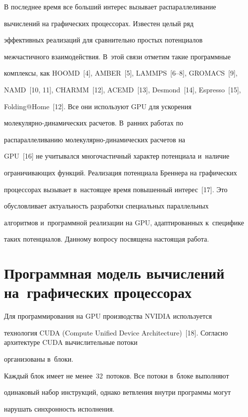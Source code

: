   В последнее время все больший интерес вызывает распараллеливание 

вы\-чис\-ле\-ний на графических процессорах. Известен целый ряд 

эффективных реализаций для сравнительно простых потенциалов 

межчастичного взаимодействия. В~этой связи отметим такие программные 

комплексы, как HOOMD~[4], AMBER~[5], LAMMPS~[6--8], GROMACS~[9], 

NAMD~[10, 11], CHARMM~[12], ACEMD~[13], Desmond~[14], Espresso~[15], 

Folding@Home~[12]. Все они используют GPU для ускорения  

мо\-ле\-ку\-ляр\-но-ди\-на\-ми\-че\-ских расчетов. В~ранних работах по 

распараллеливанию мо\-ле\-ку\-ляр\-но-ди\-на\-ми\-че\-ских расчетов на 

GPU~[16] не учитывался многочастичный характер потенциала и~наличие 

огра\-ни\-чи\-ва\-ющих функций. Реализация потенциала Бреннера на графических 

процессорах вызывает в~настоящее время повышенный интерес~[17]. Это 

обуслов\-ли\-ва\-ет актуальность разработки специальных параллельных 

алгоритмов и~программной реализации на GPU, адаптированных к~специфике 

таких потенциалов. Данному вопросу посвящена настоящая работа. 

  

  \section{Программная модель вычислений на~графических процессорах}

  

  Для программирования на GPU производства NVIDIA используется 

технология CUDA (Compute Unified Device Architecture)~[18]. Согласно архитектуре CUDA вычислительные потоки 

организованы в~блоки. 

  

  Каждый блок имеет не менее~32~потоков. Все потоки в~блоке выполняют 

одинаковый набор инструкций, однако ветвления внутри программы могут 

нарушать синхронность исполнения. 

